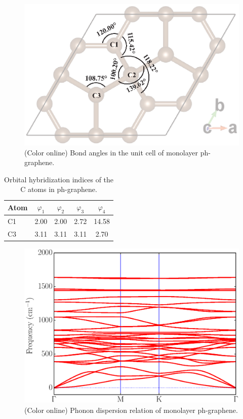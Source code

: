 \begin{figure}[htbp]
\centering
\includegraphics[width=\linewidth]{PG_bond-angle.eps}%
\caption{ (Color online) Bond angles in the unit cell of monolayer ph-graphene. \label{angle}}
\end{figure}
  
\begin{table}[htbp]
\caption{Orbital hybridization indices of the C atoms in ph-graphene. \label{hybrid}}
\begin{tabular}{lcccc}
\hline\hline
Atom & $\varphi_1$ & $\varphi_2$ & $\varphi_3$ & $\varphi_4$  \\ \hline
C1 & 2.00 & 2.00 & 2.72 & 14.58 \\
C3 & 3.11 & 3.11 & 3.11 & 2.70 \\
\hline\hline
\end{tabular}
\end{table}

\begin{figure}[hbp]
\centering
\includegraphics[width=\linewidth]{PG_phonon.eps}%
\caption{ (Color online) Phonon dispersion relation of monolayer ph-graphene. \label{phonon}}
\end{figure}

